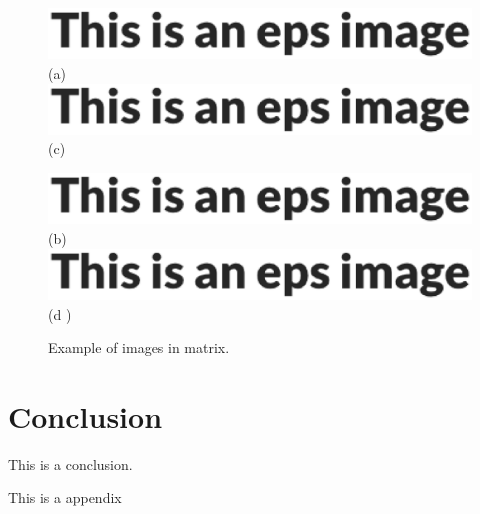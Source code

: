 \documentclass{article}
\begin{document}
    \begin{figure}[htbp] %
        \centering
        \begin{minipage}[htb]{0.45\linewidth} %
            \centering
            \includegraphics[width=\linewidth]{example}
            (a)
            \includegraphics[width=\linewidth]{example}
            (c)
        \end{minipage}
        \begin{minipage}[htb]{0.45\linewidth}
            \centering
            \includegraphics[width=\linewidth]{example}
            (b)
            \includegraphics[width=\linewidth]{example}
            (d )
        \end{minipage}
        \caption{Example of images in matrix.}
        \label{fig_3}
    \end{figure}


    \section{Conclusion}
    This is a conclusion.
    
    
    \appendixpage %
    \appendix
    This is a appendix

    
    
\end{document}

